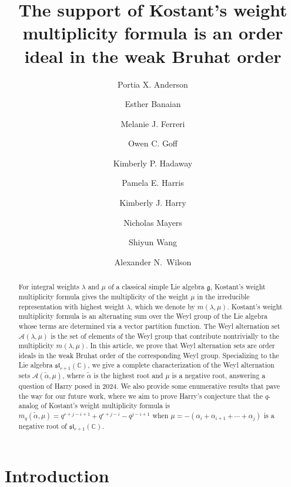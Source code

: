 \documentclass{amsart}
\author[Anderson]{Portia X. Anderson}
\author[Banaian]{Esther Banaian}
\author[Ferreri]{Melanie J. Ferreri}
\author[Goff]{Owen C. Goff}
\author[Hadaway]{Kimberly P. Hadaway}
\author[Harris]{Pamela E. Harris}
\author[Harry]{Kimberly J. Harry}
\author[Mayers]{Nicholas Mayers}
\author[Wang]{Shiyun Wang}
\author[Wilson]{Alexander N.~Wilson}
\title[Weyl alternation sets are order ideals]{The support of Kostant's weight multiplicity formula is an order ideal in the weak Bruhat order
}
\theoremstyle{definition}
\newcommand{\hroot}{\tilde{\alpha}}
\newcommand{\calA}{\mathcal{A}}
\begin{document}
\begin{abstract}
    For integral weights $\lambda$ and $\mu$ of a classical simple Lie algebra $\mathfrak{g}$, Kostant's weight multiplicity formula gives the multiplicity of the weight $\mu$ in the irreducible representation with highest weight $\lambda$, which we denote by $m(\lambda,\mu)$. 
    Kostant's weight multiplicity formula is an alternating sum over the Weyl group of the Lie algebra whose terms are determined via a vector partition function.
    The Weyl alternation set $\calA(\lambda,\mu)$ is the set of elements of the Weyl group that contribute nontrivially to the multiplicity $m(\lambda,\mu)$. 
    In this article, we prove that Weyl alternation sets are order ideals in the weak Bruhat order of the corresponding Weyl group. 
    Specializing to the Lie algebra $\mathfrak{sl}_{r+1}(\mathbb{C})$, we give a complete characterization of the Weyl alternation sets $\calA(\hroot,\mu)$, where $\hroot$ is the highest root and $\mu$ is a 
    negative root, answering a question of Harry posed in 2024. 
    We also provide some enumerative results that pave the way for our future work, where we aim to prove Harry's conjecture that the $q$-analog of Kostant's weight multiplicity formula is $m_q(\hroot,\mu)=q^{r+j-i+1}+q^{r+j-i}-q^{j-i+1}$ when $\mu=-(\alpha_i+\alpha_{i+1}+\cdots+\alpha_{j})$ is a negative root of $\mathfrak{sl}_{r+1}(\mathbb{C})$.
\end{abstract}


\maketitle
\section{Introduction}
\end{document}
